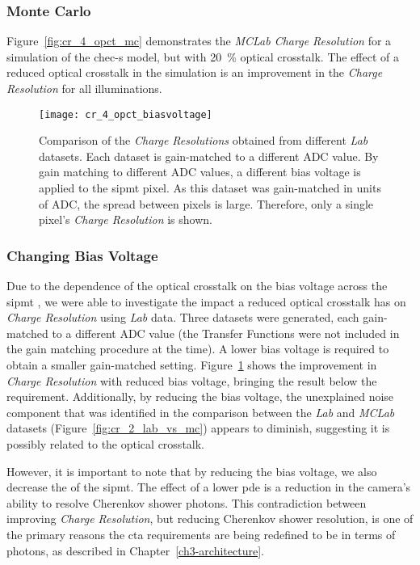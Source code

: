 \subsubsection{Monte Carlo}

Figure~\ref{fig:cr_4_opct_mc} demonstrates the \textit{MCLab Charge Resolution} for a simulation of the \gls{chec-s} model, but with \SI{20}{\percent} optical crosstalk. The effect of a reduced optical crosstalk in the simulation is an improvement in the \textit{Charge Resolution} for all illuminations.

\begin{figure}[H]
	\centering
    \texttt{[image: cr\_4\_opct\_biasvoltage]} 
	\caption[Comparison of the \textit{Lab Charge Resolution} with different bias voltages applied to the \gls{sipmt} pixel.]{Comparison of the \textit{Charge Resolutions} obtained from different \textit{Lab} datasets. Each dataset is gain-matched to a different ADC value. By gain matching to different ADC values, a different bias voltage is applied to the \gls{sipmt} pixel. As this dataset was gain-matched in units of ADC, the spread between pixels is large. Therefore, only a single pixel's \textit{Charge Resolution} is shown.}
	\label{fig:cr_4_opct_biasvoltage}
\end{figure}

\subsubsection{Changing Bias Voltage}

Due to the dependence of the optical crosstalk on the bias voltage across the \gls{sipmt} , we were able to investigate the impact a reduced optical crosstalk has on \textit{Charge Resolution} using \textit{Lab} data. Three datasets were generated, each gain-matched to a different ADC value (the Transfer Functions were not included in the gain matching procedure at the time). A lower bias voltage is required to obtain a smaller gain-matched setting. Figure~\ref{fig:cr_4_opct_biasvoltage} shows the improvement in \textit{Charge Resolution} with reduced bias voltage, bringing the result below the requirement. Additionally, by reducing the bias voltage, the unexplained noise component that was identified in the comparison between the \textit{Lab} and \textit{MCLab} datasets (Figure~\ref{fig:cr_2_lab_vs_mc}) appears to diminish, suggesting it is possibly related to the optical crosstalk.

However, it is important to note that by reducing the bias voltage, we also decrease the  of the \gls{sipmt}. The effect of a lower \gls{pde} is a reduction in the camera's ability to resolve Cherenkov shower photons. This contradiction between improving \textit{Charge Resolution}, but reducing Cherenkov shower resolution, is one of the primary reasons the \gls{cta} requirements are being redefined to be in terms of photons, as described in Chapter~\ref{ch3-architecture}.

